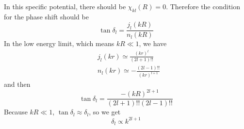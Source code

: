 In this specific potential, there should be $\chi_{kl}(R) =0$. Therefore the condition for the phase shift should be
\begin{equation}
    \tan\delta_l = \frac{j_l(kR)}{n_l(kR)}
\end{equation}
In the low energy limit, which means $kR\ll1$, we have
\begin{equation}
    \begin{aligned}
        &j_l(kr) \simeq \frac{(kr)^l}{(2l+1)!!} \\
        &n_l(kr) \simeq -\frac{(2l-1)!!}{(kr)^{l+1}}
    \end{aligned}
\end{equation}
and then 
\begin{equation}
    \tan\delta_l =\frac{-(kR)^{2l+1}}{(2l+1)!!(2l-1)!!}
\end{equation}
Because $kR\ll1$, $\tan\delta_l \approx \delta_l$, so we get
\begin{equation}
    \delta_l \propto k^{2l+1}
\end{equation}